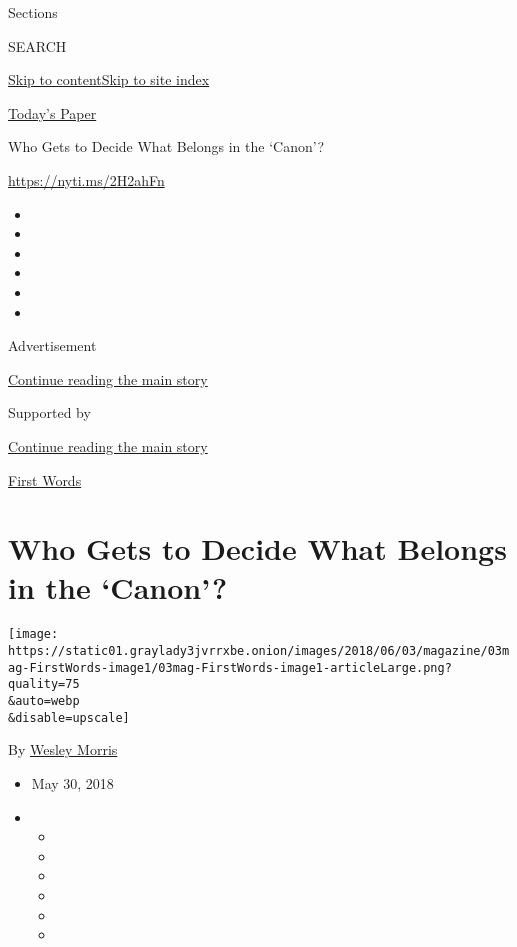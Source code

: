 Sections

SEARCH

\protect\hyperlink{site-content}{Skip to
content}\protect\hyperlink{site-index}{Skip to site index}

\href{https://myaccount.nytimes3xbfgragh.onion/auth/login?response_type=cookie\&client_id=vi}{}

\href{https://www.nytimes3xbfgragh.onion/section/todayspaper}{Today's
Paper}

Who Gets to Decide What Belongs in the `Canon'?

\url{https://nyti.ms/2H2ahFn}

\begin{itemize}
\item
\item
\item
\item
\item
\item
\end{itemize}

Advertisement

\protect\hyperlink{after-top}{Continue reading the main story}

Supported by

\protect\hyperlink{after-sponsor}{Continue reading the main story}

\href{/column/first-words}{First Words}

\hypertarget{who-gets-to-decide-what-belongs-in-the-canon}{%
\section{Who Gets to Decide What Belongs in the
`Canon'?}\label{who-gets-to-decide-what-belongs-in-the-canon}}

\texttt{[image: https://static01.graylady3jvrrxbe.onion/images/2018/06/03/magazine/03mag-FirstWords-image1/03mag-FirstWords-image1-articleLarge.png?quality=75\\\&auto=webp\\\&disable=upscale]}

By \href{http://www.nytimes3xbfgragh.onion/by/wesley-morris}{Wesley
Morris}

\begin{itemize}
\item
  May 30, 2018
\item
  \begin{itemize}
  \item
  \item
  \item
  \item
  \item
  \item
  \end{itemize}
\end{itemize}

